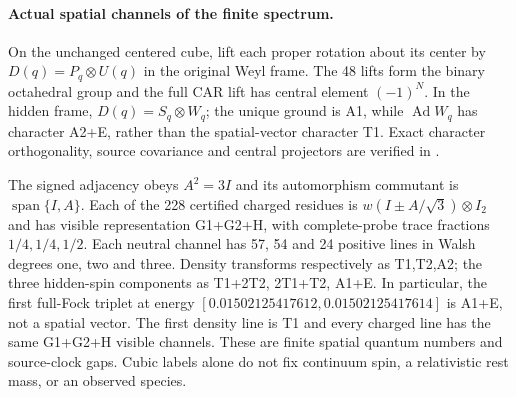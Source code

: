 \paragraph{Actual spatial channels of the finite spectrum.}
\label{sec:cubic-particle-channels}
On the unchanged centered cube, lift each proper rotation about its center
by $D(q)=P_q\otimes U(q)$ in the original Weyl frame. The 48 lifts form
the binary octahedral group and the full CAR lift has central element
$(-1)^N$. In the hidden frame, $D(q)=S_q\otimes W_q$; the unique ground
is A1, while $\operatorname{Ad}W_q$ has character A2+E, rather than
the spatial-vector character T1. Exact character orthogonality, source
covariance and central projectors are verified in
.

The signed adjacency obeys $A^2=3I$ and its automorphism commutant is
$\operatorname{span}\{I,A\}$. Each of the 228 certified charged residues
is $w(I\pm A/\sqrt3)\otimes I_2$ and has visible representation
G1+G2+H, with complete-probe trace fractions $1/4,1/4,1/2$.
Each neutral channel has 57, 54 and 24 positive lines in Walsh degrees
one, two and three. Density transforms respectively as T1,T2,A2;
the three hidden-spin components as T1+2T2, 2T1+T2, A1+E.
In particular, the first full-Fock triplet at energy
$[0.01502125417612,0.01502125417614]$ is A1+E, not a spatial vector.
The first density line is T1 and every charged line has the same
G1+G2+H visible channels. These are finite spatial quantum numbers and
source-clock gaps. Cubic labels alone do not fix continuum spin, a
relativistic rest mass, or an observed species.
